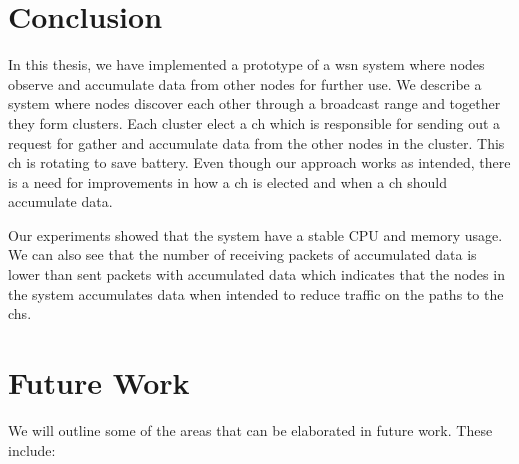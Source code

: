 \documentclass[USenglish]{uit-thesis}
\begin{document}
\chapter{Conclusion}
\glsresetall
In this thesis, we have implemented a prototype of a \gls{wsn} system where nodes observe and accumulate data from other nodes for further use. We describe a system where nodes discover each other through a broadcast range and together they form clusters. Each cluster elect  a \gls{ch} which is responsible for sending out a request for gather and accumulate data from the other nodes in the cluster. This \gls{ch} is rotating to save battery. Even though our approach works as intended, there is a need for improvements in how a \gls{ch} is elected and when a \gls{ch} should accumulate data.

Our experiments showed that the system have a stable CPU and memory usage. We can also see that the number of receiving packets of accumulated data is lower than sent packets with accumulated data which indicates that the nodes in the system accumulates data when intended to reduce traffic on the paths to the \glspl{ch}.


\chapter{Future Work}
\glsresetall
We will outline some of the areas that can be elaborated in future work. These include:
\end{document}
